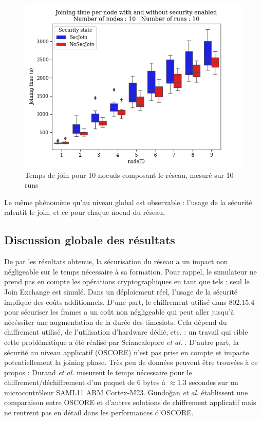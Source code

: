 \documentclass[]{report}
\begin{document}
 \vspace{0.2cm}
	\begin{figure}[!h]
	\centering
	\includegraphics[width=0.7\linewidth]{results/secjoin/boxesJoiningTimePerNode10.png}
	\caption{Temps de join pour 10 noeuds composant le réseau, mesuré sur 10 runs}
	\label{fig:join_times}
	\end{figure}

Le même phénomène qu'au niveau global est observable : l'usage de la sécurité ralentit le join, et ce pour chaque noeud du réseau.

\subsection{Discussion globale des résultats} 

De par les résultats obtenus, la sécurisation du réseau a un impact non négligeable sur le temps nécessaire à sa formation. Pour rappel, le simulateur ne prend pas en compte les opérations cryptographiques en tant que tels : seul le Join Exchange est simulé. Dans un déploiement réel, l'usage de la sécurité implique des coûts additionnels. D'une part, le chiffrement utilisé dans 802.15.4 pour sécuriser les frames a un coût non négligeable qui peut aller jusqu'à nécéssiter une augmentation de la durée des timeslots. Cela dépend du chiffrement utilisé, de l'utilisation d'hardware dédié, etc. : un travail qui cible cette problématique a été réalisé par Sciancalepore \textit{et al.} \cite{link-layer-sec-impact}. D'autre part, la sécurité au niveau applicatif (OSCORE) n'est pas prise en compte et impacte potentiellement la joining phase. Très peu de données peuvent être trouvées à ce propos : Durand \textit{et al.} \cite{OSCOREtimes} mesurent le temps nécessaire pour le chiffrement/déchiffrement d'un paquet de 6 bytes à $\approx 1.3$ secondes sur un microcontrôleur SAML11 ARM Cortex-M23. Gündoğan \textit{et al.} \cite{OSCOREvsNDN} établissent une comparaison entre OSCORE et d'autres solutions de chiffrement applicatif mais ne rentrent pas en détail dans les performances d'OSCORE.
\end{document}
